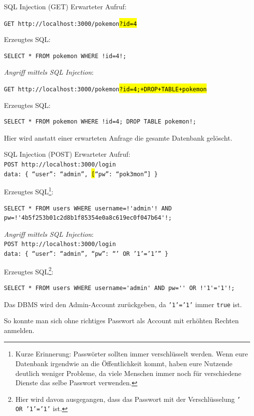 \begin{example}{SQL Injection (GET)}
    Erwarteter Aufruf:

    \texttt{GET http://localhost:3000/pokemon\hl{?id=4}}

    Erzeugtes SQL:
    \begin{lstlisting}[language=mysql]
        SELECT * FROM pokemon WHERE !id=4!;
    \end{lstlisting}

    \emph{Angriff mittels SQL Injection}:

    \texttt{GET http://localhost:3000/pokemon\hl{?id=4;+DROP+TABLE+pokemon}}

    Erzeugtes SQL:
    \begin{lstlisting}[language=mysql]
        SELECT * FROM pokemon WHERE !id=4; DROP TABLE pokemon!;
    \end{lstlisting}

    Hier wird anstatt einer erwarteten Anfrage die gesamte Datenbank gelöscht.
\end{example}

\begin{example}{SQL Injection (POST)}
    Erwarteter Aufruf: \\
    \texttt{POST http://localhost:3000/login} \\
    \texttt{data: \{ \enquote{user}: \enquote{admin}, \hl[\enquote{pw}: \enquote{pok3mon}] \}}

    Erzeugtes SQL\footnote{
        Kurze Erinnerung: Passwörter sollten immer verschlüsselt werden.
        Wenn eure Datenbank irgendwie an die Öffentlichkeit kommt, haben eure Nutzende deutlich weniger Probleme, da viele Menschen immer noch für verschiedene Dienste das selbe Passwort verwenden.
    }:
    \begin{lstlisting}[language=mysql]
        SELECT * FROM users WHERE username=!'admin'! AND pw=!'4b5f253b01c2d8b1f85354e0a8c619ec0f047b64'!;
    \end{lstlisting}

    \emph{Angriff mittels SQL Injection}: \\
    \texttt{POST http://localhost:3000/login} \\
    \texttt{data: \{ \enquote{user}: \enquote{admin}, \enquote{pw}: \enquote{' OR '1'='1'} \}}

    Erzeugtes SQL\footnote{Hier wird davon ausgegangen, dass das Passwort mit der Verschlüsselung \texttt{' OR '1'='1'} ist.}:
    \begin{lstlisting}[language=mysql]
        SELECT * FROM users WHERE username='admin' AND pw='' OR !'1'='1'!;
    \end{lstlisting}

    Das DBMS wird den Admin-Account zurückgeben, da \texttt{'1'='1'} immer \texttt{true} ist.

    So konnte man sich ohne richtiges Passwort als Account mit erhöhten Rechten anmelden.
\end{example}

